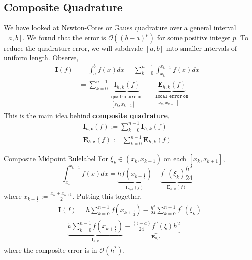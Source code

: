\subsection{Composite Quadrature}
We have looked at Newton-Cotes or Gauss quadrature over a general interval $[a, b]$. We found that the error is $\mathcal{O}\left((b-a)^p\right)$ for some positive integer $p$. To reduce the quadrature error, we will subdivide $[a, b]$ into smaller intervals of uniform length. Observe,
\begin{align*}
	\mathbf{I}(f)&=\int_a^b f(x) d x =\sum_{k=0}^{n-1} \int_{x_k}^{x_{k+1}} f(x) d x \\
	&=\sum_{k=0}^{n-1} \underbrace{\mathbf{I}_{h, k}(f)}_{\begin{array}{c}
	\texttt{quadrature on} \\
	{\left[x_k, x_{k+1}\right]}
	\end{array}}+\underbrace{\mathbf{E}_{h, k}(f)}_{\begin{array}{c}
	\texttt{local error on} \\
	{\left[x_k, x_{k+1}\right]}
	\end{array}}
\end{align*}
This is the main idea behind \textbf{composite quadrature},
\begin{align*}
	\mathbf{I}_{h, \texttt{c}}(f):=\sum_{k=0}^{n-1} \mathbf{I}_{h, k}(f) \\
	\mathbf{E}_{h, \texttt{c}}(f):=\sum_{k=0}^{n-1} \mathbf{E}_{h, k}(f)
\end{align*}

\begin{ex}{Composite Midpoint Rule}{label}
	For $\xi_k \in\left(x_k, x_{k+1}\right)$ on each $\left[x_k, x_{k+1}\right]$, 
	\[\int_{x_k}^{x_{k+1}} f(x) d x=\underbrace{h f\left(x_{k+\frac{1}{2}}\right)}_{\mathbf{I}_{h, k}(f)}-\underbrace{f^{\prime \prime}\left(\xi_k\right) \frac{h^3}{24}}_{\mathbf{E}_{h, k}(f)}\]
	where $x_{k+\frac{1}{2}}:=\frac{x_k+x_{k+1}}{2}$. Putting this together,
	\begin{align*}
		&\mathbf{I}(f)=h \sum_{k=0}^{n-1} f\left(x_{k+\frac{1}{2}}\right)-\frac{h^3}{24} \sum_{k=0}^{n-1} f^{\prime \prime}\left(\xi_k\right) \\
		&=\underbrace{h \sum_{k=0}^{n-1} f\left(x_{k+\frac{1}{2}}\right)}_{\mathbf{I}_{h, \texttt{c}}}-\underbrace{\frac{(b-a)}{24} f^{\prime \prime}(\xi) h^2}_{\mathbf{E}_{h, \texttt{c}}}
	\end{align*}
	where the composite error is in $\mathcal{O}\left(h^2\right)$.
\end{ex}

